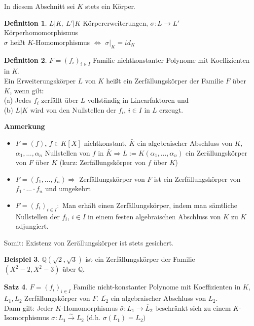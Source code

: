 \documentclass[10pt,a4paper,numbers=endperiod]{scrreprt}
\theoremstyle{definition}
\newtheorem{satz}{Satz}[section]
\newtheorem{defi}[satz]{Definition}
\newtheorem{bsp}[satz]{Beispiel}
\def\QQ{{\mathbb Q}}
\begin{document}
In diesem Abschnitt sei $K$ stets ein Körper.\\

\begin{defi}
	$L|K$, $L'|K$ Körpererweiterungen, $\sigma: L \rightarrow L'$ Körperhomomorphismus\\
	$\sigma$ heißt $K$-Homomorphismus $\Leftrightarrow$ $\sigma|_K = id_K$
\end{defi}

\begin{defi}
	$F = (f_i)_{i \in I}$ Familie nichtkonstanter Polynome mit Koeffizienten in $K$.\\
	Ein Erweiterungskörper $L$ von $K$ heißt ein Zerfällungskörper der Familie $F$ über $K$, wenn gilt:\\
	(a) Jedes $f_i$ zerfällt über $L$ vollständig in Linearfaktoren und\\
	(b) $L|K$ wird  von den Nullstellen der $f_i$, $i \in I$ in $L$ erzeugt.
\end{defi}

\textbf{Anmerkung}
\begin{itemize}
	\item $F = (f)$, $f \in K[X]$ nichtkonstant, $\bar{K}$ ein algebraischer Abschluss von $K$, $\alpha_1, \ldots, \alpha_n$ Nullstellen von $f$ in $\bar{K} \Rightarrow L:= K(\alpha_1, \ldots, \alpha_n)$ ein Zerällungskörper von $F$ über $K$ (kurz: Zerfällungskörper von $f$ über $K$)
	\item $F = (f_1, \ldots, f_n) \Rightarrow$ Zerfällungskörper von $F$ ist ein Zerfällungskörper von $f_1 \cdot \ldots \cdot f_n$ und umgekehrt
	\item $F = (f_i)_{i \in I}:$ Man erhält einen Zerfällungskörper, indem man sämtliche Nullstellen der $f_i$, $i \in I$ in einem festen algebraischen Abschluss von $K$ zu $K$ adjungiert.
\end{itemize}
	Somit: Existenz von Zerällungskörper ist stets gesichert.
\begin{bsp}
	$\QQ(\sqrt{2}, \sqrt{3})$ ist ein Zerfällungskörper der Familie $(X^2-2, X^2-3)$ über $\QQ$.
\end{bsp}

\begin{satz}
	$F = (f_i)_{i \in I}$ Familie nicht-konstanter Polynome mit Koeffizienten in $K$, $L_1, L_2$ Zerfällungskörper von $F$. $\bar{L_2}$ ein algebraischer Abschluss von $L_2$.\\
	Dann gilt: Jeder $K$-Homomorphismus $\bar{\sigma}: L_1 \rightarrow \overline{L}_2$ beschränkt sich zu einem $K$-Isomorphismus $\sigma: L_1 \overset{\sim}{\rightarrow} L_2$ (d.h. $\sigma(L_1) = L_2)$
\end{satz}
\end{document}
